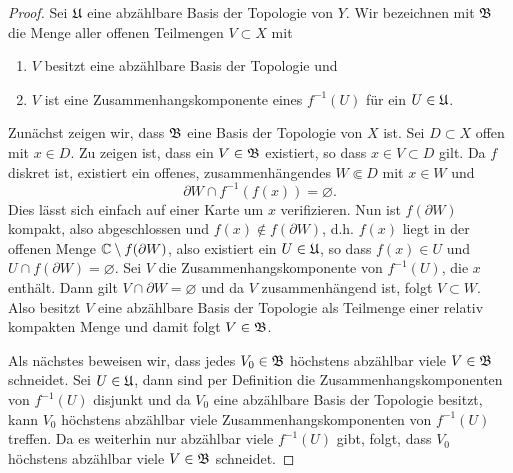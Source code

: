 \begin{proof}
  Sei $\mathfrak{U}$ eine abzählbare Basis der Topologie von $Y$. 
  Wir bezeichnen mit $\mathfrak{B}$ die Menge aller offenen Teilmengen $V \subset X$
  mit
  \begin{enumerate}
  \item $V$ besitzt eine abzählbare Basis der Topologie und 
  \item $V$ ist eine Zusammenhangskomponente eines $f^{-1}(U)$ für ein
    $U \in \mathfrak{U}$.
  \end{enumerate}
  Zunächst zeigen wir, dass $\mathfrak{B}$ eine Basis der Topologie von $X$ ist.
  Sei $D \subset X$ offen mit $x \in D$. Zu zeigen ist, dass ein $V
  \in \mathfrak{B}$ existiert, so dass $x \in V \subset D$ gilt.
  Da $f$ diskret ist, existiert ein offenes, zusammenhängendes $W \Subset D$  mit $x \in W$ und
  \[
  \partial W \cap f^{-1}(f(x)) = \varnothing.
  \]
  Dies lässt sich einfach auf einer Karte um $x$
  verifizieren. 
  Nun ist $f(\partial W)$ kompakt, also abgeschlossen und $f(x)
  \notin f(\partial W)$, d.h. $f(x)$ liegt in der offenen Menge $\mathbb{C}
  \setminus f(\partial W)$, also existiert ein $U \in \mathfrak{U}$, so dass
  $f(x) \in U$ und $U \cap f(\partial W) = \varnothing$. Sei  $V$
  die Zusammenhangskomponente von $f^{-1}(U)$, die $x$ enthält. Dann
  gilt $V \cap \partial W = \varnothing$ und da $V$ zusammenhängend
  ist, folgt $V \subset W$. Also besitzt $V$ eine abzählbare Basis
  der Topologie als Teilmenge einer relativ kompakten Menge und
  damit folgt $V \in \mathfrak{B}$.
  
  Als nächstes beweisen wir, dass jedes $V_0 \in \mathfrak{B}$ höchstens abzählbar
  viele $V \in \mathfrak{B}$ schneidet.
  Sei $U \in \mathfrak{U}$, dann sind per Definition die
  Zusammenhangskomponenten von $f^{-1}(U)$ disjunkt und da $V_0$
  eine abzählbare Basis der Topologie besitzt, kann $V_0$ höchstens
  abzählbar viele Zusammenhangskomponenten von $f^{-1}(U)$
  treffen. Da es weiterhin nur abzählbar viele $f^{-1}(U)$ gibt, folgt, dass
  $V_0$ höchstens abzählbar viele $V \in \mathfrak{B}$ schneidet.
  

\end{proof}
